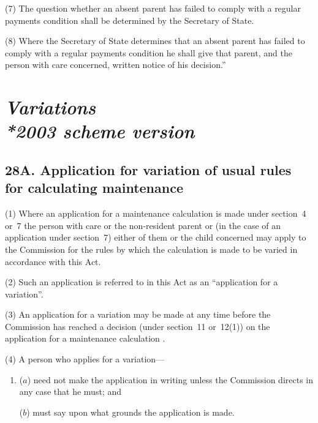 \documentclass[12pt,a4paper]{article}
\begin{document}
(7) The question whether an absent parent has failed to comply with a regular payments condition shall be determined by the Secretary of State.

(8) Where the Secretary of State determines that an absent parent has failed to comply with a regular payments condition he shall give that parent, and the person with care concerned, written notice of his decision.”


\section[\itshape Variations --- \emph{2003 scheme version}]{\itshape Variations\\*\emph{2003 scheme version}}

\subsection{28A. Application for variation of usual rules for calculating maintenance}

(1) Where an application for a maintenance calculation is made under section~4 or~7
the person with care or the non-resident parent or (in the case of an application under section~7) either of them or the child concerned may apply to the 
Commission  %
for the rules by which the calculation is made to be varied in accordance with this Act.

(2) Such an application is referred to in this Act as an “application for a variation”.

(3) An application for a variation may be made at any time before the 
Commission  %
has reached a decision (under section~11 or~12(1)) on the application for a maintenance calculation%
.

(4) A person who applies for a variation—
\begin{enumerate}\item[]
($a$) need not make the application in writing unless the 
Commission  %
directs in any case that he must; and

($b$) must say upon what grounds the application is made.
\end{enumerate}
\end{document}
